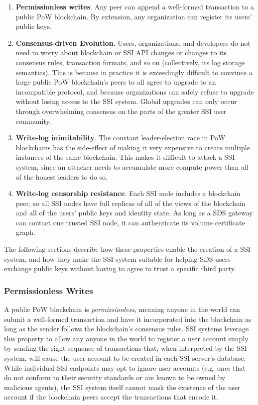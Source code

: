 \begin{enumerate}
   \item \textbf{Permissionless writes}.  Any peer can append a well-formed transaction 
      to a public PoW blockchain.  By extension, any organization can register
      its users' public keys.
   \item \textbf{Consensus-driven Evolution}.  Users, organizations, and developers do not
      need to worry about blockchain or SSI API changes or changes to its consensus
      rules, transaction formats, and so on (collectively, its log storage
      semantics).  This is because in practice it is exceedingly difficult to
      convince a large public PoW blockchain's peers to all agree to upgrade to an
      incompatible protocol, and because organizations can safely refuse to
      upgrade without losing access to the SSI system.  Global upgrades can only occur
      through overwhelming consensus on the parts of the greater SSI user community.
   \item \textbf{Write-log inimitability}.  The constant leader-election race in PoW
      blockchains has the side-effect of making it very expensive to create
      multiple instances of the same blockchain.  This makes it difficult to
      attack a SSI system, since an attacker needs to accumulate more compute
      power than all of the honest leaders to do so.
   \item \textbf{Write-log censorship resistance}.  Each SSI node includes a blockchain
      peer, so all SSI nodes have full replicas of all of the views of the
      blockchain and all of the users' public keys and identity state.
      As long as a SDS gateway can contact one trusted SSI node, it can authenticate its volume
      certificate graph.
\end{enumerate}

The following sections describe how these properties enable the creation of a
SSI system, and how they make the SSI system suitable for helping SDS users
exchange public keys without having to agree to trust a specific third party.

\subsubsection{Permissionless Writes}

A public PoW blockchain is \emph{permissionless}, meaning anyone in the world can submit a
well-formed transaction and have it incorporated into the blockchain as
long as the sender follows the blockchain's consensus rules.
SSI systems leverage this property to allow any anyone in the world to register a user account
simply by sending the right sequence of transactions that, when interpreted by the SSI system, will
cause the user account to be created in each SSI server's database.
While individual SSI endpoints may opt to ignore user accounts (e.g. ones that do not conform to their security
standards or are known to be owned by malicious agents), the SSI system itself cannot
mask the existence of the user account if the blockchain peers accept the
transactions that encode it.

